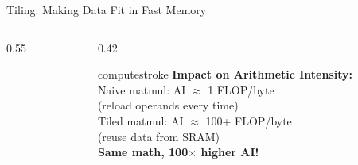 \documentclass[aspectratio=169, 12pt]{beamer}
\begin{document}
\begin{frame}{Tiling: Making Data Fit in Fast Memory}
\begin{columns}[T]
\begin{column}{0.55\textwidth}
    \vspace{0.1cm}
  \end{column}
  \begin{column}{0.42\textwidth}
    \begin{mlsyscard}{computestroke}
    \textbf{Impact on Arithmetic Intensity:}\\[0.1cm]
    {\footnotesize
    Naive matmul: AI $\approx$ 1 FLOP/byte\\
    {\footnotesize (reload operands every time)}\\[0.1cm]
    Tiled matmul: AI $\approx$ 100+ FLOP/byte\\
    {\footnotesize (reuse data from SRAM)}\\[0.1cm]
    \textcolor{datastroke}{\textbf{Same math, 100$\times$ higher AI!}}
    }
    \end{mlsyscard}
  \end{column}
\end{columns}

\end{frame}
\end{document}
